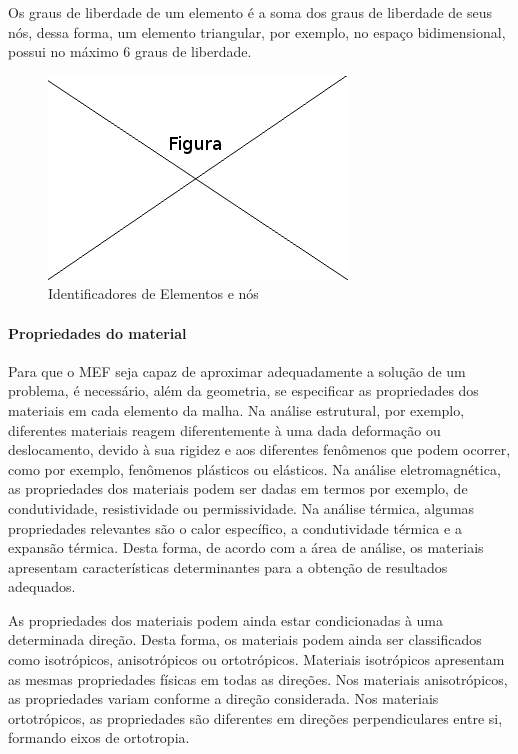 Os graus de liberdade de um elemento é a soma dos graus de liberdade de seus nós, dessa forma, um elemento triangular, por exemplo, no espaço bidimensional, possui no máximo 6 graus de liberdade.

\begin{figure}[!htb]
\centering
\includegraphics[scale=0.5]{figuras/temp.png}
\caption{Identificadores de Elementos e nós}
\label{fig:numeracao}
\end{figure}

\paragraph{Propriedades do material \\}
Para que o MEF seja capaz de aproximar adequadamente a solução de um problema, é necessário, além da geometria, se especificar as propriedades dos materiais em cada elemento da malha. Na análise estrutural, por exemplo, diferentes materiais reagem diferentemente à uma dada deformação ou  deslocamento, devido à sua rigidez e aos diferentes fenômenos que podem ocorrer, como por exemplo, fenômenos plásticos ou elásticos. Na análise eletromagnética, as propriedades dos materiais podem ser dadas em termos por exemplo, de condutividade, resistividade ou permissividade. Na análise térmica, algumas propriedades relevantes são o calor específico, a condutividade térmica e a expansão térmica.
Desta forma, de acordo com a área de análise, os materiais apresentam características determinantes para a obtenção de resultados adequados.

As propriedades dos materiais podem ainda estar condicionadas à uma determinada direção. Desta forma, os materiais podem ainda ser classificados como isotrópicos, anisotrópicos ou ortotrópicos. Materiais isotrópicos apresentam as mesmas propriedades físicas em todas as direções. Nos materiais anisotrópicos, as propriedades variam conforme a direção considerada. Nos materiais ortotrópicos, as propriedades são diferentes em direções perpendiculares entre si, formando eixos de ortotropia.

